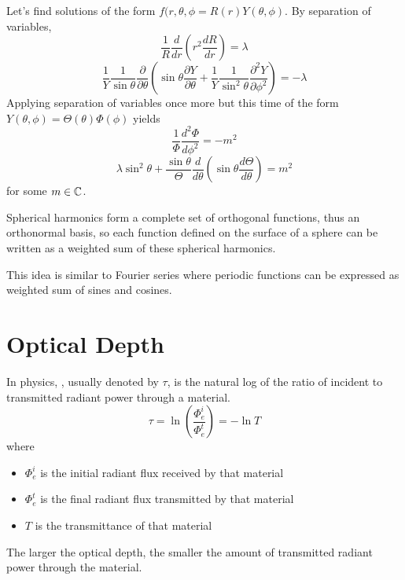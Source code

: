 \documentclass[12pt]{scrartcl}
\begin{document}
\begin{lemma}
    Let's find solutions of the form $f(r, \theta, \phi = R(r)Y(\theta, \phi)$. By separation of variables,
    \[\frac{1}{R}\frac{d}{dr}(r^2\frac{dR}{dr}) = \lambda\]
    \[\frac{1}{Y}\frac{1}{\sin\theta}\frac{\partial}{\partial \theta}(\sin \theta \frac{\partial Y}{\partial \theta} + \frac{1}{Y}\frac{1}{\sin^2\theta}\frac{\partial^2 Y}{\partial \phi^2}) = -\lambda\]
Applying separation of variables once more but this time of the form $Y(\theta, \phi) = \Theta(\theta)\Phi(\phi)$ yields
\[\frac{1}{\Phi}\frac{d^2\Phi}{d\phi^2} = -m^2\]
\[\lambda\sin^2\theta + \frac{\sin \theta}{\Theta}\frac{d}{d\theta}(\sin \theta \frac{d\Theta}{d\theta}) = m^2\]
for some $m \in \mathbb C$.
\end{lemma}

\begin{note}
    Spherical harmonics form a complete set of orthogonal functions, thus an orthonormal basis, so each function defined on the surface of a sphere can be written as a weighted sum of these spherical harmonics.
\end{note}

\begin{note}
    This idea is similar to Fourier series where periodic functions can be expressed as weighted sum of sines and cosines.
\end{note}

\section{Optical Depth}

\begin{definition}
    In physics, , usually denoted by $\tau$, is the natural log of the ratio of incident to transmitted radiant power through a material.
\[\tau = \ln\left(\frac{\Phi^i_e}{\Phi^t_e}\right) = -\ln T\]
where 
\begin{itemize}
    \item $\Phi_e^i$ is the initial radiant flux received by that material
    \item $\Phi_e^t$ is the final radiant flux transmitted by that material
    \item $T$ is the transmittance of that material
\end{itemize}
\end{definition}

\begin{note}
    The larger the optical depth, the smaller the amount of transmitted radiant power through the material.
\end{note}
\end{document}
